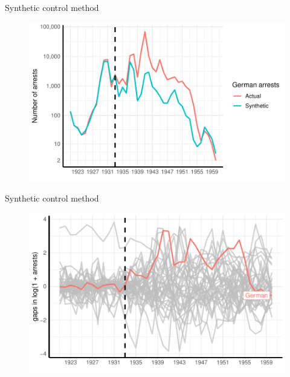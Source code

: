 \documentclass[11pt]{beamer}
\begin{document}
\begin{frame}{Synthetic control method}
 \begin{figure}[h]
\centering
\includegraphics[width=1\textwidth]{comparison_plot_scaled.pdf}
\label{fig:sc_comp_plot}
\end{figure}
\end{frame}



\begin{frame}{Synthetic control method}
 \begin{figure}[h]
\centering
\includegraphics[width=1\textwidth]{placebo_highlight_all_imp_date.pdf}
\label{fig:sc_placebo_gaps_all}
\end{figure}
\end{frame}
\end{document}

